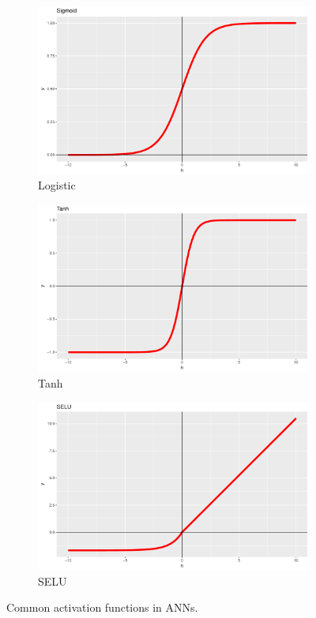 \begin{figure}[htp!]
	\begin{subfigure}[t]{0.3\figwidth}
		\centering
		\includegraphics[width=\linewidth]{Sigmoid.pdf} 
		\caption{Logistic} \label{Fig.Sigmoid}
	\end{subfigure}
	\begin{subfigure}[t]{0.3\figwidth}
		\centering
		\includegraphics[width=\linewidth]{Tanh.pdf} 
		\caption{Tanh} \label{Fig.Tanh}
	\end{subfigure}
	\begin{subfigure}[t]{0.3\figwidth}
		\centering
		\includegraphics[width=\linewidth]{SELU.pdf} 
		\caption{SELU} \label{Fig.SELU}
	\end{subfigure}

	\caption{Common activation functions in ANNs.}
	\label{Fig.ActivationFunctions}
\end{figure}


